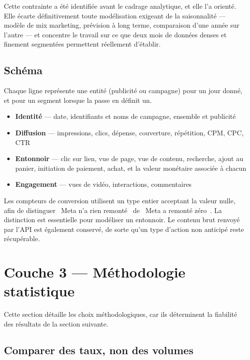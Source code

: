 \documentclass[11pt,a4paper]{article}
\begin{document}
Cette contrainte a été identifiée avant le cadrage analytique, et elle l'a
orienté. Elle écarte définitivement toute modélisation exigeant de la
saisonnalité --- modèle de mix marketing, prévision à long terme, comparaison
d'une année sur l'autre --- et concentre le travail sur ce que deux mois de
données denses et finement segmentées permettent réellement d'établir.

\subsection{Schéma}

Chaque ligne représente une entité (publicité ou campagne) pour un jour donné,
et pour un segment lorsque la passe en définit un.

\begin{itemize}
  \item \textbf{Identité} --- date, identifiants et noms de campagne, ensemble
        et publicité
  \item \textbf{Diffusion} --- impressions, clics, dépense, couverture,
        répétition, CPM, CPC, CTR
  \item \textbf{Entonnoir} --- clic sur lien, vue de page, vue de contenu,
        recherche, ajout au panier, initiation de paiement, achat, et la valeur
        monétaire associée à chacun
  \item \textbf{Engagement} --- vues de vidéo, interactions, commentaires
\end{itemize}

Les compteurs de conversion utilisent un type entier acceptant la valeur nulle,
afin de distinguer \guillemotleft~Meta n'a rien remonté~\guillemotright{} de
\guillemotleft~Meta a remonté zéro~\guillemotright. La distinction est
essentielle pour modéliser un entonnoir. Le contenu brut renvoyé par l'API est
également conservé, de sorte qu'un type d'action non anticipé reste récupérable.

\section{Couche 3 --- Méthodologie statistique}

Cette section détaille les choix méthodologiques, car ils déterminent la
fiabilité des résultats de la section suivante.

\subsection{Comparer des taux, non des volumes}
\end{document}
